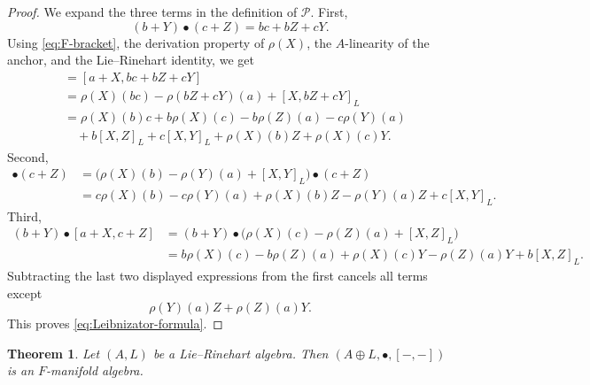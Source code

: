 \documentclass[12pt,reqno]{amsart}
\newtheorem{theorem}{Theorem}[section]
\theoremstyle{definition}
\theoremstyle{remark}
\newcommand{\Pcal}{\mathcal P}
\begin{document}
	\begin{proof}
		We expand the three terms in the definition of $\Pcal$.  First,
		\[
		(b+Y)\bullet(c+Z)=bc+bZ+cY.
		\]
		Using \eqref{eq:F-bracket}, the derivation property of $\rho(X)$, the
		$A$-linearity of the anchor, and the Lie--Rinehart identity, we get
		\begin{align*}
			[a+X,(b+Y)\bullet(c+Z)]
			&= [a+X,bc+bZ+cY] \\
			&=\rho(X)(bc)-\rho(bZ+cY)(a)+[X,bZ+cY]_L \\
			&=\rho(X)(b)c+b\rho(X)(c)-b\rho(Z)(a)-c\rho(Y)(a) \\
			&\quad +b[X,Z]_L+c[X,Y]_L+\rho(X)(b)Z+\rho(X)(c)Y.
		\end{align*}
		Second,
		\begin{align*}
			[a+X,b+Y]\bullet(c+Z)
			&=\bigl(\rho(X)(b)-\rho(Y)(a)+[X,Y]_L\bigr)\bullet(c+Z) \\
			&=c\rho(X)(b)-c\rho(Y)(a)+\rho(X)(b)Z-\rho(Y)(a)Z+c[X,Y]_L.
		\end{align*}
		Third,
		\begin{align*}
			(b+Y)\bullet[a+X,c+Z]
			&=(b+Y)\bullet\bigl(\rho(X)(c)-\rho(Z)(a)+[X,Z]_L\bigr) \\
			&=b\rho(X)(c)-b\rho(Z)(a)+\rho(X)(c)Y-\rho(Z)(a)Y+b[X,Z]_L.
		\end{align*}
		Subtracting the last two displayed expressions from the first cancels all
		terms except
		\[
		\rho(Y)(a)Z+\rho(Z)(a)Y.
		\]
		This proves \eqref{eq:Leibnizator-formula}.
	\end{proof}
	
	\begin{theorem}\label{thm:LR-to-FMan}
		Let $(A,L)$ be a Lie--Rinehart algebra.  Then
		$(A\oplus L,\bullet,[-,-])$ is an $F$-manifold algebra.
	\end{theorem}
	
\end{document}
